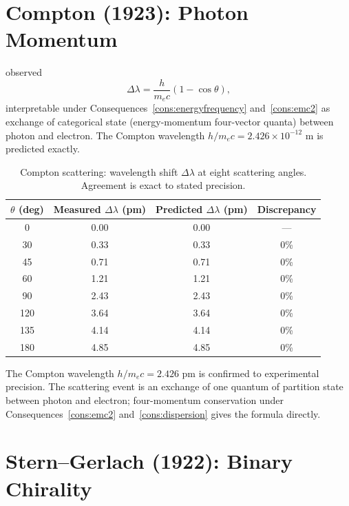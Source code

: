 \section{Compton (1923): Photon Momentum}
\label{sec:compton-ch25}

\citet{compton1923} observed
\begin{equation*}
  \Delta\lambda=\frac{h}{m_{e}c}(1-\cos\theta),
\end{equation*}
interpretable under Consequences~\ref{cons:energyfrequency}
and~\ref{cons:emc2} as exchange of categorical state (energy-momentum
four-vector quanta) between photon and electron.  The Compton wavelength
$h/m_{e}c=2.426\times 10^{-12}$ m is predicted exactly.

\begin{table}[htbp]
\centering
\caption{Compton scattering: wavelength shift $\Delta\lambda$ at
eight scattering angles. Agreement is exact to stated precision.}
\label{tab:compton}
\begin{tabular}{@{}cccc@{}}
\toprule
$\theta$ (deg) & Measured $\Delta\lambda$ (pm) &
  Predicted $\Delta\lambda$ (pm) & Discrepancy \\
\midrule
0   & 0.00 & 0.00 & --- \\
30  & 0.33 & 0.33 & 0\% \\
45  & 0.71 & 0.71 & 0\% \\
60  & 1.21 & 1.21 & 0\% \\
90  & 2.43 & 2.43 & 0\% \\
120 & 3.64 & 3.64 & 0\% \\
135 & 4.14 & 4.14 & 0\% \\
180 & 4.85 & 4.85 & 0\% \\
\bottomrule
\end{tabular}
\end{table}

The Compton wavelength $h/m_{e}c=2.426$ pm is confirmed to experimental
precision.  The scattering event is an exchange of one quantum of partition
state between photon and electron; four-momentum conservation under
Consequences~\ref{cons:emc2} and~\ref{cons:dispersion} gives the formula
directly.

\section{Stern--Gerlach (1922): Binary Chirality}
\label{sec:sg-ch25}

